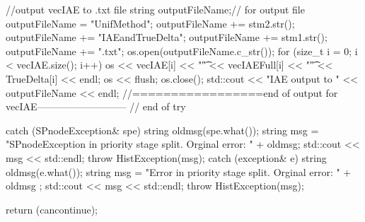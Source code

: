 \begin{DoxyCode}
{{         //output vecIAE to .txt file
      string outputFileName;// for output file
      outputFileName = "UnifMethod";
      outputFileName += stm2.str();
      outputFileName += "IAEandTrueDelta";
      outputFileName += stm1.str();
      outputFileName += ".txt";
      os.open(outputFileName.c_str());
      for (size_t i = 0; i < vecIAE.size(); i++){
        os << vecIAE[i] << "\t" << vecIAEFull[i] << "\t" << TrueDelta[i] << 
      endl;
      }
      os << flush;
      os.close();
      std::cout << "IAE output to " << outputFileName << endl;
      //=================end of output for vecIAE---------------------------      
   } // end of try
    
    catch (SPnodeException& spe) {
        string oldmsg(spe.what());
        string msg = "SPnodeException in priority stage split.  Orginal error: 
      "
                                    + oldmsg;
        std::cout << msg << std::endl;
        throw HistException(msg);
    }
    catch (exception& e) {
        string oldmsg(e.what());
        string msg = "Error in priority stage split.  Orginal error: " + oldmsg
      ;
        std::cout << msg << std::endl;
        throw HistException(msg);
    }
    
   return (cancontinue);
}
\end{DoxyCode}
